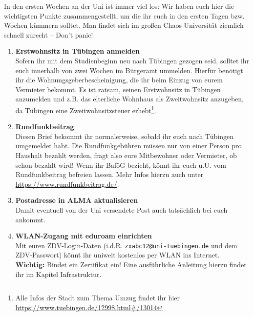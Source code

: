 
In den ersten Wochen an der Uni ist immer viel los: Wir haben euch hier die wichtigsten Punkte zusammengestellt, um die ihr euch in den ersten Tagen bzw. Wochen kümmern solltet. Man findet sich im großen Chaos Universität ziemlich schnell zurecht -- Don't panic!
  
  \begin{enumerate}[label=$\bigcirc$]
  	\item \textbf{Erstwohnsitz in Tübingen anmelden} \\
  		Sofern ihr mit dem Studienbeginn neu nach Tübingen gezogen seid, solltet ihr euch innerhalb von zwei Wochen im Bürgeramt ummelden. Hierfür benötigt ihr die Wohnungsgeberbescheinigung, die ihr beim Einzug von eurem Vermieter bekommt. Es ist ratsam, seinen Erstwohnsitz in Tübingen anzumelden und z.B. das elterliche Wohnhaus als Zweitwohnsitz anzugeben, da Tübingen eine Zweitwohnsitzsteuer erhebt\footnote{Alle Infos der Stadt zum Thema Umzug findet ihr hier \url{https://www.tuebingen.de/12998.html\#/13014}}.
  	
	\item \textbf{Rundfunkbeitrag} \\
		Diesen Brief bekommt ihr normalerweise, sobald ihr euch nach Tübingen umgemeldet habt. Die Rundfunkgebühren müssen nur von einer Person pro Haushalt bezahlt werden, fragt also eure Mitbewohner oder Vermieter, ob schon bezahlt wird! Wenn ihr BaföG bezieht, könnt ihr euch u.U. vom Rundfunkbeitrag befreien lassen. Mehr Infos hierzu auch unter \url{https://www.rundfunkbeitrag.de/}.
  	
  	\item \textbf{Postadresse in ALMA aktualisieren}\\
  		Damit eventuell von der Uni versendete Post auch tatsächlich bei euch ankommt.
  	
  	\item \textbf{WLAN-Zugang mit eduroam einrichten}\\
  		Mit euren ZDV-Login-Daten (i.d.R. \texttt{zxabc12@uni-tuebingen.de} und dem ZDV-Passwort) könnt ihr uniweit kostenlos per WLAN ins Internet. \textbf{Wichtig:} Bindet ein Zertifikat ein! Eine ausführliche Anleitung hierzu findet ihr im Kapitel Infrastruktur.
  	

\end{enumerate}
